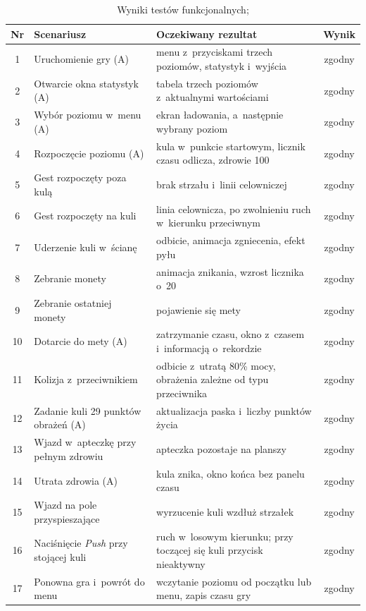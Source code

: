 \begin{table}[!htb]
  \centering
  \caption{Wyniki testów funkcjonalnych; \zrodloWlasne}
  \label{tab:testy}
  \begin{tabularx}{\textwidth}{c >{\raggedright\arraybackslash}p{5.0cm} X c}
    \toprule
    \textbf{Nr} & \textbf{Scenariusz} & \textbf{Oczekiwany rezultat} & \textbf{Wynik} \\
    \midrule
    1 & Uruchomienie gry (A) & menu z~przyciskami trzech poziomów, statystyk i~wyjścia & zgodny \\
    2 & Otwarcie okna statystyk (A) & tabela trzech poziomów z~aktualnymi wartościami & zgodny \\
    3 & Wybór poziomu w~menu (A) & ekran ładowania, a~następnie wybrany poziom & zgodny \\
    4 & Rozpoczęcie poziomu (A) & kula w~punkcie startowym, licznik czasu odlicza, zdrowie 100 & zgodny \\
    5 & Gest rozpoczęty poza kulą & brak strzału i~linii celowniczej & zgodny \\
    6 & Gest rozpoczęty na kuli & linia celownicza, po zwolnieniu ruch w~kierunku przeciwnym & zgodny \\
    7 & Uderzenie kuli w~ścianę & odbicie, animacja zgniecenia, efekt pyłu & zgodny \\
    8 & Zebranie monety & animacja znikania, wzrost licznika o~20 & zgodny \\
    9 & Zebranie ostatniej monety & pojawienie się mety & zgodny \\
    10 & Dotarcie do mety (A) & zatrzymanie czasu, okno z~czasem i~informacją o~rekordzie & zgodny \\
    11 & Kolizja z~przeciwnikiem & odbicie z~utratą 80\% mocy, obrażenia zależne od typu przeciwnika & zgodny \\
    12 & Zadanie kuli 29 punktów obrażeń (A) & aktualizacja paska i~liczby punktów życia & zgodny \\
    13 & Wjazd w~apteczkę przy pełnym zdrowiu & apteczka pozostaje na planszy & zgodny \\
    14 & Utrata zdrowia (A) & kula znika, okno końca bez panelu czasu & zgodny \\
    15 & Wjazd na pole przyspieszające & wyrzucenie kuli wzdłuż strzałek & zgodny \\
    16 & Naciśnięcie \emph{Push} przy stojącej kuli & ruch w~losowym kierunku; przy toczącej się kuli przycisk nieaktywny & zgodny \\
    17 & Ponowna gra i~powrót do menu & wczytanie poziomu od początku lub menu, zapis czasu gry & zgodny \\
    \bottomrule
  \end{tabularx}
\end{table}

